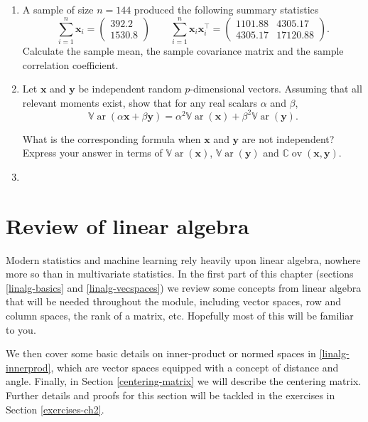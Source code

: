 \documentclass[]{book}
\theoremstyle{definition}
\theoremstyle{definition}
\theoremstyle{definition}
\theoremstyle{remark}
\begin{document}
\begin{enumerate}
\def\labelenumi{\arabic{enumi}.}
\setcounter{enumi}{2}
\item
  A sample of size \(n=144\) produced the following summary statistics
  \[ \sum_{i=1}^n \boldsymbol x_i = \begin{pmatrix} 392.2 \\ 1530.8 \end{pmatrix} \qquad \sum_{i=1}^n \boldsymbol x_i \boldsymbol x_i^\top = \begin{pmatrix} 1101.88 & 4305.17 \\ 4305.17 & 17120.88 \end{pmatrix}.\]
  Calculate the sample mean, the sample covariance matrix and the sample correlation coefficient.
\item
  Let \(\boldsymbol x\) and \(\boldsymbol y\) be independent random \(p\)-dimensional vectors. Assuming that all relevant moments exist, show that for any real scalars \(\alpha\) and \(\beta\),
  \[{\mathbb{V}\operatorname{ar}}(\alpha \boldsymbol x+ \beta \boldsymbol y) = \alpha^2 {\mathbb{V}\operatorname{ar}}(\boldsymbol x) + \beta^2 {\mathbb{V}\operatorname{ar}}(\boldsymbol y).\]

  What is the corresponding formula when \(\boldsymbol x\) and \(\boldsymbol y\) are not independent? Express your answer in terms of \({\mathbb{V}\operatorname{ar}}(\boldsymbol x)\), \({\mathbb{V}\operatorname{ar}}(\boldsymbol y)\) and \({\mathbb{C}\operatorname{ov}}(\boldsymbol x, \boldsymbol y)\).
\item
\end{enumerate}

\hypertarget{linalg-prelim}{%
\chapter{Review of linear algebra}\label{linalg-prelim}}

Modern statistics and machine learning rely heavily upon linear algebra, nowhere more so than in multivariate statistics. In the first part of this chapter (sections \ref{linalg-basics} and \ref{linalg-vecspaces}) we review some concepts from linear algebra that will be needed throughout the module, including vector spaces, row and column spaces, the rank of a matrix, etc. Hopefully most of this will be familiar to you.

We then cover some basic details on inner-product or normed spaces in \ref{linalg-innerprod}, which are vector spaces equipped with a concept of distance and angle.
Finally, in Section \ref{centering-matrix} we will describe the centering matrix. Further details and proofs for this section will be tackled in the exercises in Section \ref{exercises-ch2}.
\end{document}
